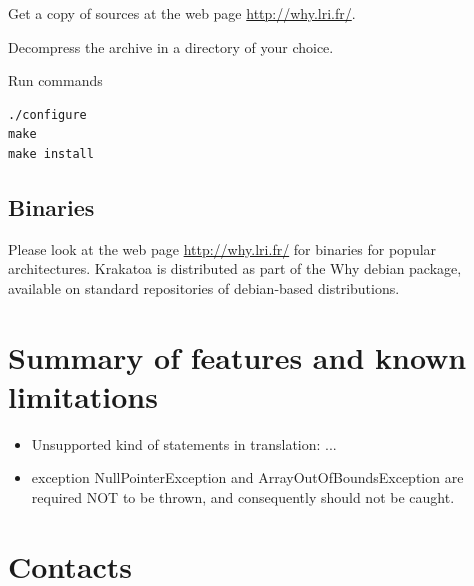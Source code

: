 \documentclass[a4paper,11pt,twoside,openright]{report}
\begin{document}
Get a copy of sources at the web page \url{http://why.lri.fr/}.

Decompress the archive in a directory of your choice.

Run commands
\begin{verbatim}
./configure
make
make install
\end{verbatim}

\subsection{Binaries}

Please look at the web page \url{http://why.lri.fr/} for binaries for
popular architectures. Krakatoa is distributed as part of the Why
debian package, available on standard repositories of debian-based
distributions.

\section{Summary of features and known limitations}
\label{sec:features}

\begin{itemize}

\item Unsupported kind of statements in translation: ...

\item exception NullPointerException and ArrayOutOfBoundsException are
required NOT to be thrown, and consequently should not be caught.



\end{itemize}

\section{Contacts}
\end{document}
